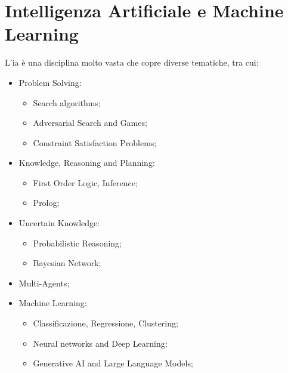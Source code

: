 \section{Intelligenza Artificiale e Machine Learning}\label{sub:intelligenza_artificiale_e_machine_learning} %
L'\ac{ia} è una disciplina molto vasta che copre diverse tematiche, tra cui:
\begin{itemize}
    \item Problem Solving:
    \begin{itemize}
        \item Search algorithms;
        \item Adversarial Search and Games;
        \item Constraint Satisfaction Problems;
    \end{itemize}
    \item Knowledge, Reasoning and Planning:
    \begin{itemize}
        \item First Order Logic, Inference;
        \item Prolog;
    \end{itemize}
    \item Uncertain Knowledge:
    \begin{itemize}
        \item Probabilistic Reasoning;
        \item Bayesian Network;
    \end{itemize}
    \item Multi-Agents;
    \item Machine Learning:
    \begin{itemize}
        \item Classificazione, Regressione, Clustering;
        \item Neural networks and Deep Learning;
        \item Generative AI and Large Language Models;
    \end{itemize}
\end{itemize}
%
